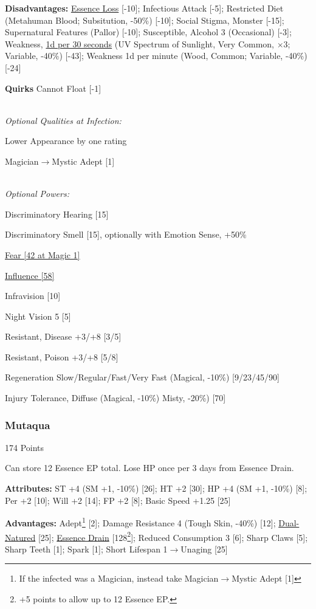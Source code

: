 \begin{multicols*}{3}
	\textbf{Disadvantages:}	
	\hyperref[essence_loss]{Essence Loss} [-10]; Infectious Attack [-5]; Restricted Diet (Metahuman Blood; Subsitution, -50\%) [-10]; Social Stigma, Monster [-15];  Supernatural Features (Pallor) [-10]; Susceptible, Alcohol 3 (Occasional) [-3]; Weakness, \textcolor{Blue}{\href{http://forums.sjgames.com/showpost.php?p=149688&postcount=7}{1d per 30 seconds}} (UV Spectrum of Sunlight, Very Common, $\times$3; Variable, -40\%) [-43]; Weakness 1d per minute (Wood, Common; Variable, -40\%) [-24]
	
	\textbf{Quirks} 
	Cannot Float [-1]
	
	\textit{\\Optional Qualities at Infection:}
	
	Lower Appearance by one rating	
	
	Magician$\rightarrow$Mystic Adept [1]
	
	\textit{\\Optional Powers:}
	
	Discriminatory Hearing [15]
	
	Discriminatory Smell [15], optionally with Emotion Sense, +50\%
	
	\hyperref[fear]{Fear [42 at Magic 1]}
	
	\hyperref[influence]{Influence [58]}
	
	Infravision [10]
	
	Night Vision 5 [5]
	
	Resistant, Disease +3/+8 [3/5]
	
	Resistant, Poison +3/+8 [5/8]
	
	Regeneration Slow/Regular/Fast/Very Fast (Magical, -10\%) [9/23/45/90]
	
	Injury Tolerance, Diffuse (Magical, -10\%) Misty, -20\%) [70]
	
	\subsubsection{Mutaqua}\label{mutaqua}
	\begin{flushright}
		174 Points
	\end{flushright}
	
	Can store 12 Essence EP total.
	Lose HP once per 3 days from Essence Drain.
		
	\textbf{Attributes:}
	ST +4 (SM +1, -10\%) [26]; HT +2 [30]; HP +4 (SM +1, -10\%) [8]; Per +2 [10]; Will +2 [14]; FP +2 [8]; Basic Speed +1.25 [25]
	
	\textbf{Advantages:}
	Adept\footnote{If the infected was a Magician, instead take Magician$\rightarrow$Mystic Adept [1]} [2]; Damage Resistance 4 (Tough Skin, -40\%) [12]; \hyperref[dual_natured]{Dual-Natured} [25];  \hyperref[essence_drain]{Essence Drain} [128\footnote{+5 points to allow up to 12 Essence EP.}]; Reduced Consumption 3 [6]; Sharp Claws [5]; Sharp Teeth [1]; Spark [1]; Short Lifespan 1$\rightarrow$Unaging [25]
	

\end{multicols*}
